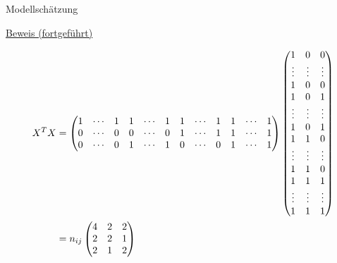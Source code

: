 \documentclass[
  8pt,
  ignorenonframetext,
]{beamer}
\begin{document}
\begin{frame}{Modellschätzung}
\protect\hypertarget{modellschuxe4tzung-2}{}
\footnotesize
\vspace{1mm}

\underline{Beweis (fortgeführt)}

\tiny

\begin{align}
\renewcommand{\arraystretch}{1}
\begin{split}
X^TX
& =
\setcounter{MaxMatrixCols}{20}
\begin{pmatrix}
1 & \cdots & 1 & 1 & \cdots & 1 & 1 & \cdots & 1 & 1 & \cdots & 1   \\
0 & \cdots & 0 & 0 & \cdots & 0 & 1 & \cdots & 1 & 1 & \cdots & 1   \\
0 & \cdots & 0 & 1 & \cdots & 1 & 0 & \cdots & 0 & 1 & \cdots & 1   \\
\end{pmatrix}
\begin{pmatrix}
1       &   0       &   0        \\
\vdots  &   \vdots  &   \vdots   \\
1       &   0       &   0        \\
1       &   0       &   1        \\
\vdots  &   \vdots  &   \vdots   \\
1       &   0       &   1        \\
1       &   1       &   0        \\
\vdots  &   \vdots  &   \vdots   \\
1       &   1       &   0        \\
1       &   1       &   1        \\
\vdots  &   \vdots  &   \vdots   \\
1       &   1       &   1        \\
\end{pmatrix}
\\
&
=
n_{ij}
\begin{pmatrix*}[r]
4 & 2 & 2 \\
2 & 2 & 1 \\
2 & 1 & 2 \\
\end{pmatrix*}
\end{split}
\end{align}
\end{frame}
\end{document}

